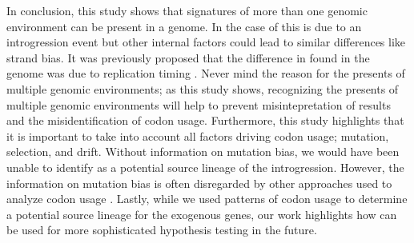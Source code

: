 \documentclass[12pt, letter]{article}
\begin{document}
In conclusion, this study shows that signatures of more than one genomic environment can be present in a genome.
In the case of \kluyveri this is due to an introgression event but other internal factors could lead to similar differences like strand bias.
It was previously proposed that the difference in \GC found in the \kluyveri genome was due to replication timing \citep{payen2009, agier2013}.
Never mind the reason for the presents of multiple genomic environments; as this study shows, recognizing the presents of multiple genomic environments will help to prevent misintepretation of results and the misidentification of codon usage.
Furthermore, this study highlights that it is important to take into account all factors driving codon usage; mutation, selection, and drift.
Without information on mutation bias, we would have been unable to identify \gossypii as a potential source lineage of the introgression. 
However, the information on mutation bias is often disregarded by other approaches used to analyze codon usage \citep{sharp1987}.
Lastly, while we used patterns of codon usage to determine a potential source lineage for the exogenous genes, our work highlights how \ROC can be used for more sophisticated hypothesis testing in the future.
















\end{document}
